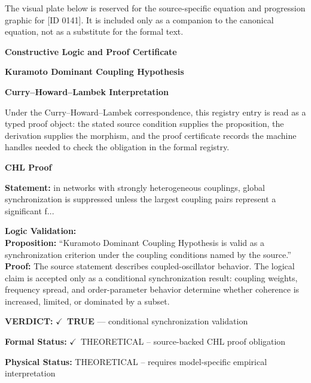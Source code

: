\begingroup\footnotesize\sloppy
The visual plate below is reserved for the source-specific equation and progression graphic for [ID 0141]. It is included only as a companion to the canonical equation, not as a substitute for the formal text.
\par\endgroup
\ifTZPDarkEdition
{}
\fi

\clearpage
\begingroup\tzpsupportsetup
\noindent\textbf{\fontsize{10.8pt}{12.8pt}\selectfont [ID 0141] Constructive Logic and Proof Certificate}\par
\noindent\textbf{\fontsize{10pt}{12pt}\selectfont Kuramoto Dominant Coupling Hypothesis}\par
\vspace{0.45em}
\begingroup
\footnotesize
\setlength{\parskip}{0.22em}
\setlength{\parindent}{0pt}
\noindent\textbf{Curry--Howard--Lambek Interpretation}\par
Under the Curry--Howard--Lambek correspondence, this registry entry is read as a typed proof
object: the stated source condition supplies the proposition, the derivation supplies the
morphism, and the proof certificate records the machine handles needed to check the obligation
in the formal registry.

\vspace{0.45em}
\noindent\textbf{CHL Proof}\par
\textbf{Statement:} in networks with strongly heterogeneous couplings, global synchronization is suppressed
unless the largest coupling pairs represent a significant f...

\textbf{Logic Validation:}\\
\textbf{Proposition:} ``Kuramoto Dominant Coupling Hypothesis is valid as a synchronization criterion under the
coupling conditions named by the source.''\\
\textbf{Proof:} The source statement describes coupled-oscillator behavior. The logical claim is
accepted only as a conditional synchronization result: coupling weights, frequency
spread, and order-parameter behavior determine whether coherence is increased, limited,
or dominated by a subset.

\textbf{VERDICT:} \ensuremath{\checkmark}\ \textbf{TRUE} --- conditional synchronization validation

\textbf{Formal Status:} \ensuremath{\checkmark}\ THEORETICAL -- source-backed CHL proof obligation

\textbf{Physical Status:} THEORETICAL -- requires model-specific empirical interpretation
\par\vspace{0.45em}
\par
\ifTZPDarkEdition
{}
\fi
\endgroup
\endgroup
